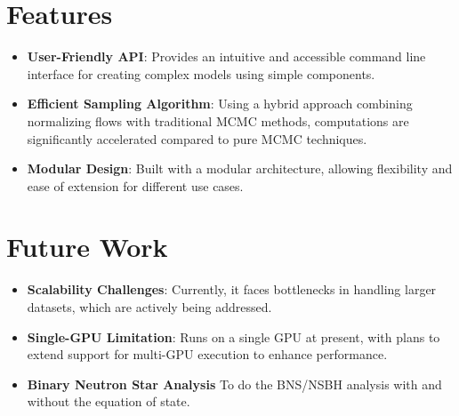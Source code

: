 \documentclass[a0,portrait]{a0poster}
\begin{document}
\begin{multicols}{2}

\section*{Features}

\begin{itemize}
    
\item \textbf{User-Friendly API}: Provides an intuitive and accessible command line interface for creating complex models using simple components.  
\item \textbf{Efficient Sampling Algorithm}: Using a hybrid approach combining normalizing flows with traditional MCMC methods, computations are significantly accelerated compared to pure MCMC techniques.
\item \textbf{Modular Design}: Built with a modular architecture, allowing flexibility and ease of extension for different use cases.

\end{itemize}

\columnbreak

\section*{Future Work}

\begin{itemize}
    
\item \textbf{Scalability Challenges}: Currently, it faces bottlenecks in handling larger datasets, which are actively being addressed.  
\item \textbf{Single-GPU Limitation}: Runs on a single GPU at present, with plans to extend support for multi-GPU execution to enhance performance.
\item \textbf{Binary Neutron Star Analysis} To do the BNS/NSBH analysis with and without the equation of state.

\end{itemize}


\end{multicols}
\end{document}
